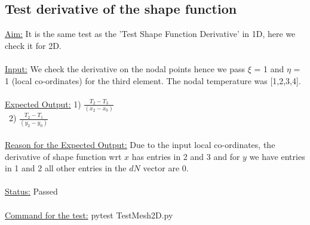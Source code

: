 \subsection{Test derivative of the shape function}
\underline{Aim:} It is the same test as the 'Test Shape Function Derivative' in 1D, here we check it for 2D.\\ \\
\noindent \underline{Input:} We check the derivative on the nodal points hence we pass $\xi$ = 1 and $\eta$ = 1 (local co-ordinates) for the third element. The nodal temperature was [1,2,3,4]. \\ \\
\underline{Expected Output:} 1) $\frac{T_2-T_3}{(x_2-x_0)}$\\
\indent \indent \indent \indent \indent \indent \indent \indent \ 2) $\frac{T_2-T_1}{(y_2-y_0)}$\\ \\
\underline{Reason for the Expected Output:} Due to the input local co-ordinates, the derivative of shape function wrt $x$ has entries in 2 and 3 and for $y$ we have entries in 1 and 2 all other entries in the $dN$ vector are 0.\\ \\
\underline{Status:} Passed\\ \\

\noindent \underline{Command for the test:} pytest Test\textunderscore Mesh\textunderscore 2D.py\\